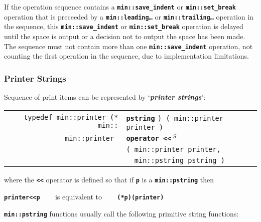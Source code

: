 \documentclass[12pt]{article}
\makeatletter
\newcommand{\TT}[1]{{\tt \bfseries #1}}
\newcommand{\skey}[2]{{\bf \em #1#2}\index{#1}}
\newcommand{\ttindex}[1]{\index{#1@{\tt #1}}}
\newcommand{\ttomkey}[3]{\TT{operator #2}\index{#1@{\tt operator #2}!{#3}}}
\newcommand{\EOL}{\penalty \exhyphenpenalty}
\newenvironment{indpar}[1][0.3in]%
	{\begin{list}{}%
		     {\setlength{\itemsep}{0in}%
		      \setlength{\topsep}{0in}%
		      \setlength{\parsep}{1ex}%
		      \setlength{\labelwidth}{#1}%
		      \setlength{\leftmargin}{#1}%
		      \addtolength{\leftmargin}{\labelsep}}%
	 \item}%
	{\end{list}}
\newcommand{\LABEL}[1]{\label{#1}}
\newlength{\ARGBREAKLENGTH}
\newcommand{\ARGBREAK}[1][\ARGBREAKLENGTH]{\\&\hspace*{#1}}
\newcommand{\TTOMKEY}[3]{\ttomkey{#1}{#2}{#3}}
\newcommand{\MINKEY}[1]%
	   {\TT{#1}\ttindex{min::#1}\ttindex{#1}}
\newcommand{\RESIZE}{$\,^S$}
\makeatother
\begin{document}
If the operation sequence contains a
\TT{min::save\_indent}\label{LEADING-TRAILING-SAVE-INDENT}
or \TT{min::set\_break} operation\label{LEADING-TRAILING-SET-BREAK}
that is preceeded by a \TT{min::leading\ldots} or \TT{min::trailing\ldots}
operation in the sequence, this
\TT{min::save\_indent} or \TT{min::set\_break} operation
is delayed until the space is output or a decision not to output
the space has been made.
The sequence must not contain more than one \TT{min::save\_indent}
operation, not counting the first operation in the sequence,
due to implementation limitations.


\subsubsection{Printer Strings}
\label{PRINTER-STRINGS}

Sequence of print items can be represented by `\skey{printer string}s':

\begin{indpar}\begin{tabular}{r@{}l}
\verb|typedef min::printer (* min::| & \MINKEY{pstring}
				       \verb|) ( min::printer printer )|
\LABEL{MIN::PSTRING} \\
\verb|min::printer |
    & \TTOMKEY{<<}{<{}<\RESIZE}%
              {of {\tt min::pstring}}\ARGBREAK
      \verb|( min::printer printer,|\ARGBREAK
      \verb|  min::pstring pstring )|
\LABEL{PRINTER_OPERATOR<<_OF_PSTRING} \\
\end{tabular}\end{indpar}

where the \TT{<{}<} operator is defined so that if \TT{p} is a
\TT{min::\EOL pstring} then
\begin{center}
\TT{printer<{}<p} ~~~ is equivalent to ~~~ \TT{(*p)(printer)}
\end{center}

\TT{min::pstring} functions usually call the following primitive
string functions:
\end{document}
